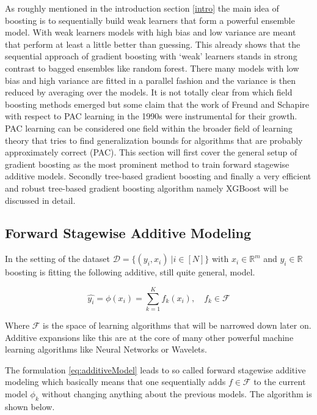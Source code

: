\documentclass[
]{book}
\begin{document}
As roughly mentioned in the introduction section \ref{intro} the main idea of boosting is to sequentially build weak learners that form a powerful ensemble model. With weak learners models with high bias and low variance are meant that perform at least a little better than guessing. This already shows that the sequential approach of gradient boosting with `weak' learners stands in strong contrast to bagged ensembles like random forest. There many models with low bias and high variance are fitted in a parallel fashion and the variance is then reduced by averaging over the models.\citep{HandsOnMLwithR} It is not totally clear from which field boosting methods emerged but some claim that the work of Freund and Schapire with respect to PAC learning in the 1990s were instrumental for their growth.\citep{elements} PAC learning can be considered one field within the broader field of learning theory that tries to find generalization bounds for algorithms that are probably approximately correct (PAC).\citep{pacbounds} This section will first cover the general setup of gradient boosting as the most prominent method to train forward stagewise additive models. Secondly tree-based gradient boosting and finally a very efficient and robust tree-based gradient boosting algorithm namely XGBoost will be discussed in detail.

\hypertarget{forward-stagewise-additive-modeling}{%
\subsection{Forward Stagewise Additive Modeling}\label{forward-stagewise-additive-modeling}}

In the setting of the dataset \(\mathcal{D} = \{(y_i,x_i)\ | i \in [N]\}\) with \(x_i \in \mathbb{R}^m\) and \(y_i \in \mathbb{R}\) boosting is fitting the following additive, still quite general, model.

\begin{equation}
  \hat{y_i} = \phi(x_i) = \sum_{k=1}^{K} f_k(x_i), \quad f_k \in \mathcal{F}
  \label{eq:additiveModel}
\end{equation}

Where \(\mathcal{F}\) is the space of learning algorithms that will be narrowed down later on. Additive expansions like this are at the core of many other powerful machine learning algorithms like Neural Networks or Wavelets.\citep{elements}

The formulation \eqref{eq:additiveModel} leads to so called forward stagewise additive modeling which basically means that one sequentially adds \(f \in \mathcal{F}\) to the current model \(\phi_k\) without changing anything about the previous models.\citep{elements} The algorithm is shown below.
\end{document}
